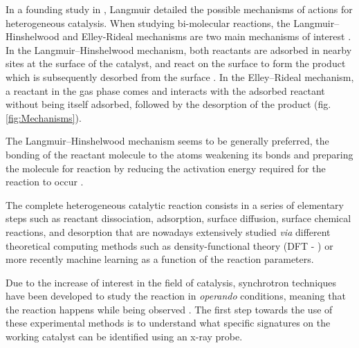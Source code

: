 In a founding study in \cite*{Langmuir1922}, Langmuir detailed the possible mechanisms of actions for heterogeneous catalysis.
When studying bi-molecular reactions, the Langmuir–Hinshelwood and Elley-Rideal mechanisms are two main mechanisms of interest \parencite{catal12101134}.
In the Langmuir–Hinshelwood mechanism, both reactants are adsorbed in nearby sites at the surface of the catalyst, and react on the surface to form the product which is subsequently desorbed from the surface \parencite{Prins2018, ROSS2019}.
In the Elley–Rideal mechanism, a reactant in the gas phase comes and interacts with the adsorbed reactant without being itself adsorbed, followed by the desorption of the product \parencite{rideal_1939, Weinberg1996}  (fig. \ref{fig:Mechanisms}).


The Langmuir–Hinshelwood mechanism seems to be generally preferred, the bonding of the reactant molecule to the atoms weakening its bonds and preparing the molecule for reaction by reducing the activation energy required for the reaction to occur \parencite{Baxter2002}.

The complete heterogeneous catalytic reaction consists in a series of elementary steps such as reactant dissociation, adsorption, surface diffusion, surface chemical reactions, and desorption that are nowadays extensively studied \textit{via} different theoretical computing methods such as density-functional theory (DFT - \cite{Reuter2004, Molenbroek2009, Yawei2015, Gaggioli2019, Chatelier2020}) or more recently machine learning \parencite{Kitchin2018, Schlexer2019, Anstine2023} as a function of the reaction parameters.

Due to the increase of interest in the field of catalysis, synchrotron techniques have been developed to study the reaction in \textit{operando} conditions, meaning that the reaction happens while being observed \parencite{Meirer2018}.
The first step towards the use of these experimental methods is to understand what specific signatures on the working catalyst can be identified using an x-ray probe.


